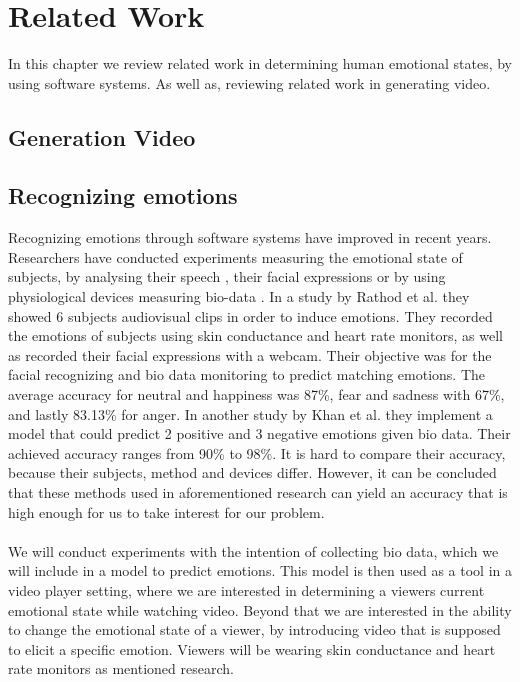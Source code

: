\chapter{Related Work}
In this chapter we review related work in determining human emotional states, by using software systems. As well as, reviewing related work in generating video.
\section{Generation Video}

\section{Recognizing emotions}\label{sec:recogEmotions}
Recognizing emotions through software systems have improved in recent years. Researchers have conducted experiments measuring the emotional state of subjects, by analysing their speech \cite{SpeechEmotionRecognize}, their facial expressions \cite{FaceEmotionRecognize} or by using physiological devices measuring bio-data \cite{RecognizingEmotion, EmotionSense}. In a study by Rathod et al. \cite{BioSignalsEmotionModel} they showed 6 subjects audiovisual clips in order to induce emotions. They recorded the emotions of subjects using skin conductance and heart rate monitors, as well as recorded their facial expressions with a webcam. Their objective was for the facial recognizing and bio data monitoring to predict matching emotions. The average accuracy for neutral and happiness was 87\%, fear and sadness with 67\%, and lastly 83.13\% for anger. In another study by Khan et al. \cite{RecognizingEmotion} they implement a model that could predict 2 positive and 3 negative emotions given bio data. Their achieved accuracy ranges from 90\% to 98\%. It is hard to compare their accuracy, because their subjects, method and devices differ. However, it can be concluded that these methods used in aforementioned research can yield an accuracy that is high enough for us to take interest for our problem.
\\ \\
We will conduct experiments with the intention of collecting bio data, which we will include in a model to predict emotions. This model is then used as a tool in a video player setting, where we are interested in determining a viewers current emotional state while watching video. Beyond that we are interested in the ability to change the emotional state of a viewer, by introducing video that is supposed to elicit a specific emotion. Viewers will be wearing skin conductance and heart rate monitors as mentioned research.
